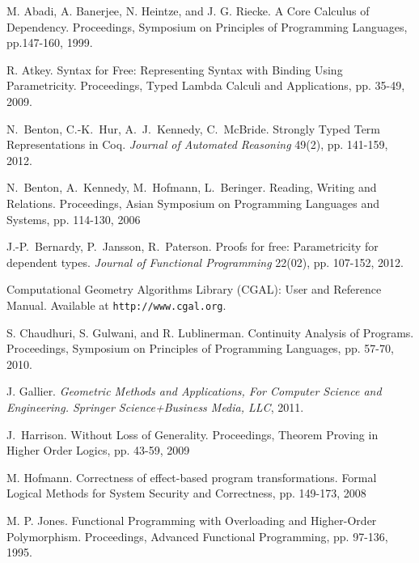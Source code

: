 \documentclass[preprint]{sigplanconf}
\theoremstyle{examplestyle}
\theoremstyle{restatementstyle}
\begin{document}

\begin{thebibliography}{12}
\softraggedright

M. Abadi, A. Banerjee, N. Heintze, and J. G. Riecke. A Core Calculus
of Dependency. Proceedings, Symposium on Principles of Programming
Languages, pp.147-160, 1999.

R. Atkey.  Syntax for Free: Representing Syntax with Binding Using
Parametricity.  Proceedings, Typed Lambda Calculi and Applications,
pp. 35-49, 2009.

N.~Benton, C.-K.~Hur, A.~J.~Kennedy, C.~McBride.
Strongly Typed Term Representations in {Coq}.
{\em Journal of Automated Reasoning} 49(2), pp. 141-159, 2012.

N.~Benton, A.~Kennedy, M.~Hofmann, L.~Beringer.
Reading, Writing and Relations.
Proceedings, Asian Symposium on Programming Languages and Systems,
pp. 114-130, 2006

J.-P.~Bernardy, P.~Jansson, R.~Paterson.
Proofs for free: Parametricity for dependent types.
{\em Journal of Functional Programming} 22(02), pp. 107-152, 2012.

Computational Geometry Algorithms Library (CGAL): User and Reference
Manual.  Available at {\tt http://www.cgal.org}.

S. Chaudhuri, S. Gulwani, and R. Lublinerman.  Continuity Analysis of
Programs.  Proceedings, Symposium on Principles of Programming
Languages, pp. 57-70, 2010.

J. Gallier. {\em Geometric Methods and Applications, For Computer
Science and Engineering. Springer Science+Business Media, LLC}, 2011.

J.~Harrison.
Without Loss of Generality.
Proceedings, Theorem Proving in Higher Order Logics,
pp. 43-59, 2009

M. Hofmann. Correctness of effect-based program
transformations. Formal Logical Methods for System Security and
Correctness, pp. 149-173, 2008

M. P. Jones.  Functional Programming with Overloading and Higher-Order
Polymorphism. Proceedings, Advanced Functional Programming,
pp. 97-136, 1995.


\end{thebibliography}
\end{document}
